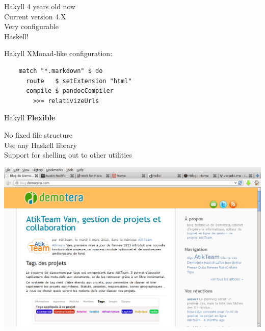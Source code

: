 \documentclass[20pt]{beamer}
\newcommand{\vspaced}{
    \vspace{5mm}
}
\begin{document}
\begin{frame}{Hakyll}
    4 years old now \\
    Current version 4.X \\
    Very configurable \\
    Haskell! \\
\end{frame}

\begin{frame}[fragile]{Hakyll}
    XMonad-like configuration: \\
    \vspaced
    \begin{lstlisting}
    match "*.markdown" $ do
      route   $ setExtension "html"
      compile $ pandocCompiler
        >>= relativizeUrls
    \end{lstlisting}
\end{frame}

\begin{frame}{Hakyll}
    \textbf{Flexible} \\
    \vspaced
    No fixed file structure \\
    Use any Haskell library \\
    Support for shelling out to other utilities \\
\end{frame}

\begin{frame}[plain]
    \includegraphics[width=\textwidth]{../2013-odhac-hakyll/images/example-demotera.png}
\end{frame}
\end{document}
